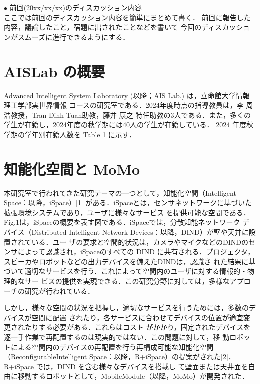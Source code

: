 \documentclass[11pt, a4paper]{jarticle}
\begin{document}
\author{B3 塚 春輝} %
\date{2025/03/11} %

\maketitle %



\noindent
$\bullet$ 前回(20xx/xx/xx)のディスカッション内容\\
ここでは前回のディスカッション内容を簡単にまとめて書く．
前回に報告した内容，議論したこと，宿題に出されたことなどを書いて
今回のディスカッションがスムーズに進行できるようにする\cite{aa}．



\section{AISLab の概要}
Advanced Intelligent System Laboratory (以降；AIS Lab.) は，立命館大学情報理工学部実世界情報
コースの研究室である．2024年度時点の指導教員は，李 周浩教授，Tran Dinh Tuan助教，藤井 康之
特任助教の3人である．また，多くの学生が在籍し，2024年度の秋学期には40人の学生が在籍している．
2024 年度秋学期の学年別在籍人数を Table 1 に示す．

\section{知能化空間と MoMo}
本研究室で行われてきた研究テーマの一つとして，知能化空間（Intelligent Space：以降，iSpace）[1]
がある．iSpaceとは，センサネットワークに基づいた拡張環境システムであり，ユーザに様々なサービス
を提供可能な空間である．Fig.1は，iSpaceの概要を表す図である．iSpaceでは，分散知能ネットワーク
デバイス（Distributed Intelligent Network Devices：以降，DIND）が壁や天井に設置されている．ユー
ザの要求と空間的状況は，カメラやマイクなどのDINDのセンサによって認識され，iSpaceのすべての
DIND に共有される．プロジェクタ，スピーカやロボットなどの出力デバイスを備えたDINDは，認識さ
れた結果に基づいて適切なサービスを行う．これによって空間内のユーザに対する情報的・物理的なサー
ビスの提供を実現できる．この研究分野に対しては，多様なアプローチの研究が行われている．

しかし，様々な空間の状況を把握し，適切なサービスを行うためには，多数のデバイスが空間に配置
されたり，各サービスに合わせてデバイスの位置が適宜変更されたりする必要がある．これらはコスト
がかかり，固定されたデバイスを逐一手作業で再配置するのは現実的ではない．この問題に対して，移
動ロボットによる空間内のデバイスの再配置を行う再構成可能な知能化空間（ReconfigurableIntelligent
 Space：以降，R+iSpace）の提案がされた[2]．R+iSpace では，DIND を含む様々なデバイスを搭載し
て壁面または天井面を自由に移動するロボットとして，MobileModule（以降，MoMo）が開発された．
\end{document}
